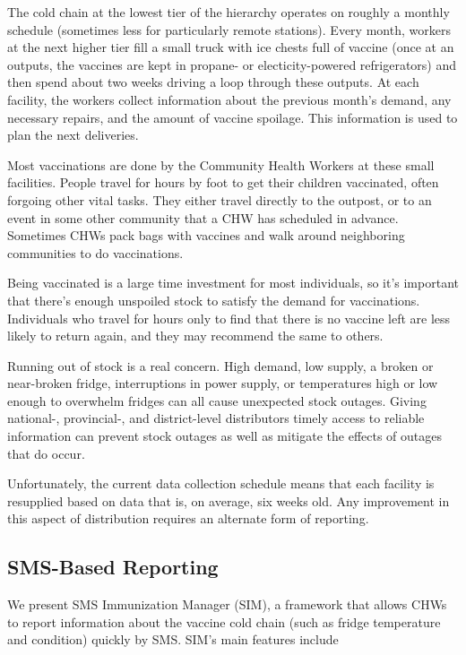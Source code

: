 \documentclass{acm_proc_article-sp}
\begin{document}
The cold chain at the lowest tier of the hierarchy operates on roughly a monthly schedule (sometimes less for particularly remote stations). Every month, workers at the next higher tier fill a small truck with ice chests full of vaccine (once at an outputs, the vaccines are kept in propane- or electicity-powered refrigerators) and then spend about two weeks driving a loop through these outputs. At each facility, the workers collect information about the previous month's demand, any necessary repairs, and the amount of vaccine spoilage. This information is used to plan the next deliveries. 

Most vaccinations are done by the Community Health Workers at these small facilities. People travel for hours by foot to get their children vaccinated, often forgoing other vital tasks. They either travel directly to the outpost, or to an event in some other community that a CHW has scheduled in advance. Sometimes CHWs pack bags with vaccines and walk around neighboring communities to do vaccinations. 

Being vaccinated is a large time investment for most individuals, so it's important that there's enough unspoiled stock to satisfy the demand for vaccinations. Individuals who travel for hours only to find that there is no vaccine left are less likely to return again, and they may recommend the same to others. 

Running out of stock is a real concern. High demand, low supply, a broken or near-broken fridge, interruptions in power supply, or temperatures high or low enough to overwhelm fridges can all cause unexpected stock outages. Giving national-, provincial-, and district-level distributors timely access to reliable information can prevent stock outages as well as mitigate the effects of outages that do occur. 

Unfortunately, the current data collection schedule means that each facility is resupplied based on data that is, on average, six weeks old. Any improvement in this aspect of distribution requires an alternate form of reporting. 

\subsection{SMS-Based Reporting}

We present SMS Immunization Manager (SIM), a framework that allows CHWs to report information about the vaccine cold chain (such as fridge temperature and condition) quickly by SMS. SIM's main features include 
\end{document}
